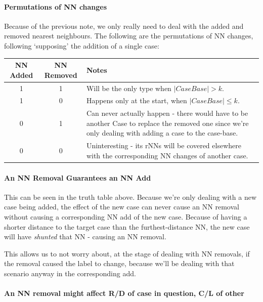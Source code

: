 \documentclass[a4paper,11pt]{report}
\begin{document}
\begin{samepage}
\paragraph{Permutations of NN changes}
Because of the previous note, we only really need to deal with the added and removed nearest neighbours. The following are the permutations of NN changes, following `supposing' the addition of a single case:

\vspace{10pt}

\begin{tabular}{ | c | c | p{280pt} |} \hline
	NN Added & NN Removed & Notes \\ \hline
	1 & 1 & Will be the only type when $\left|CaseBase\right|> k$. \\ \hline
	1 & 0 & Happens only at the start, when $\left|CaseBase\right|\leq k$. \\ \hline
	0 & 1 & Can never actually happen - there would have to be another Case to replace the removed one since we're only dealing with adding a case to the case-base. \\ \hline
	0 & 0 & Uninteresting - its rNNs will be covered elsewhere with the corresponding NN changes of another case. \\ \hline
\end{tabular}

\end{samepage}

\paragraph{An NN Removal Guarantees an NN Add}
This can be seen in the truth table above. Because we're only dealing with a new case being added, the effect of the new case can never cause an NN removal without causing a corresponding NN add of the new case. Because of having a shorter distance to the target case than the furthest-distance NN, the new case will have \emph{shunted} that NN - causing an NN removal.

This allows us to not worry about, at the stage of dealing with NN removals, if the removal caused the label to change, because we'll be dealing with that scenario anyway in the corresponding add.

\paragraph{An NN removal might affect R/D of case in question, C/L of other}
\end{document}
